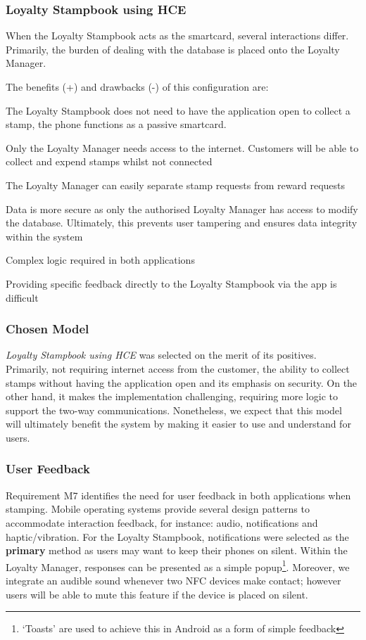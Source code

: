 \subsubsection{Loyalty Stampbook using HCE}
When the Loyalty Stampbook acts as the smartcard, several interactions differ. Primarily, the burden of dealing with the database is placed onto the Loyalty Manager.

The benefits (+) and drawbacks (-) of this configuration are: 
\begin{description}[leftmargin=!,labelwidth=\widthof{\bfseries small}]
    \item[+] The Loyalty Stampbook does not need to have the application open to collect a stamp, the phone functions as a passive smartcard.
    \item[+] Only the Loyalty Manager needs access to the internet. Customers will be able to collect and expend stamps whilst not connected
    \item[+] The Loyalty Manager can easily separate stamp requests from reward requests
    \item[+] Data is more secure as only the authorised Loyalty Manager has access to modify the database. Ultimately, this prevents user tampering and ensures data integrity within the system
    \item[---] Complex logic required in both applications
    \item[---] Providing specific feedback directly to the Loyalty Stampbook via the app is difficult
\end{description}

\subsubsection{Chosen Model}
\emph{Loyalty Stampbook using HCE} was selected on the merit of its positives. Primarily, not requiring internet access from the customer, the ability to collect stamps without having the application open and its emphasis on security. On the other hand, it makes the implementation challenging, requiring more logic to support the two-way communications. Nonetheless, we expect that this model will ultimately benefit the system by making it easier to use and understand for users.

\subsubsection{User Feedback}
Requirement M7 identifies the need for user feedback in both applications when stamping. Mobile operating systems provide several design patterns to accommodate interaction feedback, for instance: audio, notifications and haptic/vibration. For the Loyalty Stampbook, notifications were selected as the \textbf{primary} method as users may want to keep their phones on silent. Within the Loyalty Manager, responses can be presented as a simple popup\footnote{`Toasts' are used to achieve this in Android as a form of simple feedback}. Moreover, we integrate an audible sound whenever two NFC devices make contact; however users will be able to mute this feature if the device is placed on silent. 

